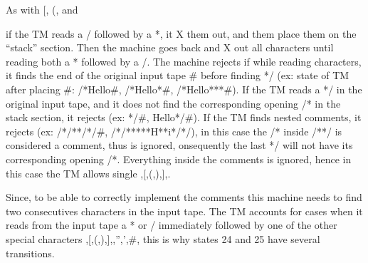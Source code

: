 \documentclass{article}
\begin{document}
{As with [, (, and { if the TM reads a / followed by a *, it X them out, and them place them on the “stack” section. Then the machine goes back and X out all characters 
until reading both a * followed by a /. The machine rejects if while reading characters, it finds the end of the original input tape # before finding */ 
(ex: state of TM after placing #: /*Hello#, /*Hello*#, /*Hello***#). If the TM reads a */ in the original input tape, and it does not find the corresponding opening 
/* in the stack section, it rejects (ex: */#, Hello*/#). If the TM finds nested comments, it rejects (ex: /*/**/*/#, /*/*****H**i*/*/), in this case the /* inside /**/ 
is considered a comment, thus is ignored, onsequently the last */ will not have its corresponding opening /*. Everything inside the comments is ignored, hence in this 
case the TM allows single {,[,(,),],}. 

Since, to be able to correctly implement the comments this machine needs to find two consecutives characters in the input tape. The TM accounts for cases when it reads
from the input tape a * or / immediately followed by one of the other special characters  {,[,(,),],},”,’,#, this is why states 24 and 25 have several transitions. 

}}
\end{document}
